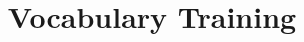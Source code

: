 \documentclass{ctexart}
\title{Vocabulary Training}
\begin{document}
\maketitle
\begin{multicols}{2}
\end{multicols}
\end{document}

